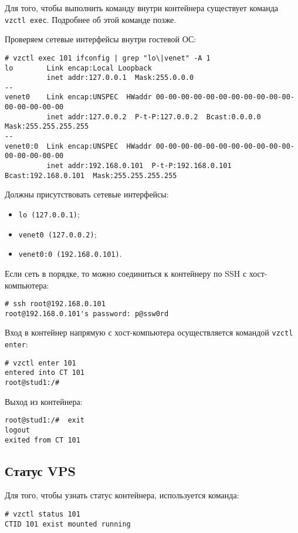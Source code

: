 Для того, чтобы выполнить команду внутри контейнера существует команда \texttt{vzctl exec}.
Подробнее об этой команде позже.

Проверяем сетевые интерфейсы внутри гостевой ОС:
\begin{lstlisting}
# vzctl exec 101 ifconfig | grep "lo\|venet" -A 1
lo        Link encap:Local Loopback  
          inet addr:127.0.0.1  Mask:255.0.0.0
--
venet0    Link encap:UNSPEC  HWaddr 00-00-00-00-00-00-00-00-00-00-00-00-00-00-00-00  
          inet addr:127.0.0.2  P-t-P:127.0.0.2  Bcast:0.0.0.0  Mask:255.255.255.255
--
venet0:0  Link encap:UNSPEC  HWaddr 00-00-00-00-00-00-00-00-00-00-00-00-00-00-00-00  
          inet addr:192.168.0.101  P-t-P:192.168.0.101  Bcast:192.168.0.101  Mask:255.255.255.255

\end{lstlisting}

Должны присутствовать сетевые интерфейсы:
\begin{itemize}
    \item \texttt{lo (127.0.0.1)};
    \item \texttt{venet0 (127.0.0.2)};
    \item \texttt{venet0:0 (192.168.0.101)}.
\end{itemize}

Если сеть в порядке, то можно соединиться к контейнеру по SSH с хост-компьютера:
\begin{lstlisting}
# ssh root@192.168.0.101
root@192.168.0.101's password: p@ssw0rd
\end{lstlisting}

Вход в контейнер напрямую с хост-компьютера осуществляется командой \texttt{vzctl enter}:
\begin{lstlisting}
# vzctl enter 101
entered into CT 101
root@stud1:/# 
\end{lstlisting}

Выход из контейнера:
\begin{lstlisting}
root@stud1:/#  exit
logout
exited from CT 101
\end{lstlisting}

\subsection{Статус VPS}
Для того, чтобы узнать статус контейнера, используется команда:
\begin{lstlisting}
# vzctl status 101
CTID 101 exist mounted running
\end{lstlisting}

